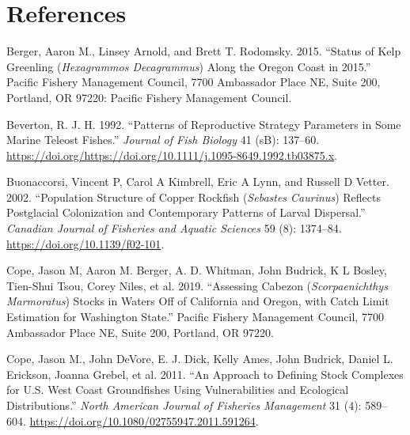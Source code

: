 \documentclass[11pt,
  english,
  a4paper,
]{article}
\begin{document}
\leavevmode\tagmcend\tagstructend\par

\clearpage


\hypertarget{references}{%
\section{References}\label{references}}

\leavevmode\tagmcend\tagstructend


\hypertarget{refs}{}
\leavevmode\hypertarget{ref-berger_kelpgreenling_2015}{}%
Berger, Aaron M., Linsey Arnold, and Brett T. Rodomsky. 2015. ``Status of Kelp Greenling (\emph{Hexagrammos Decagrammus}) Along the Oregon Coast in 2015.'' Pacific Fishery Management Council, 7700 Ambassador Place NE, Suite 200, Portland, OR 97220: Pacific Fishery Management Council.

\leavevmode\hypertarget{ref-Beverton1992}{}%
Beverton, R. J. H. 1992. ``Patterns of Reproductive Strategy Parameters in Some Marine Teleost Fishes.'' \emph{Journal of Fish Biology} 41 (sB): 137--60. \url{https://doi.org/https://doi.org/10.1111/j.1095-8649.1992.tb03875.x}.

\leavevmode\hypertarget{ref-buonaccorsi_population_2002}{}%
Buonaccorsi, Vincent P, Carol A Kimbrell, Eric A Lynn, and Russell D Vetter. 2002. ``Population Structure of Copper Rockfish (\emph{Sebastes Caurinus}) Reflects Postglacial Colonization and Contemporary Patterns of Larval Dispersal.'' \emph{Canadian Journal of Fisheries and Aquatic Sciences} 59 (8): 1374--84. \url{https://doi.org/10.1139/f02-101}.

\leavevmode\hypertarget{ref-cope_cabezon_2019}{}%
Cope, Jason M, Aaron M. Berger, A. D. Whitman, John Budrick, K L Bosley, Tien-Shui Tsou, Corey Niles, et al. 2019. ``Assessing Cabezon (\emph{Scorpaenichthys Marmoratus}) Stocks in Waters Off of California and Oregon, with Catch Limit Estimation for Washington State.'' Pacific Fishery Management Council, 7700 Ambassador Place NE, Suite 200, Portland, OR 97220.

\leavevmode\hypertarget{ref-cope_approach_2011}{}%
Cope, Jason M., John DeVore, E. J. Dick, Kelly Ames, John Budrick, Daniel L. Erickson, Joanna Grebel, et al. 2011. ``An Approach to Defining Stock Complexes for U.S. West Coast Groundfishes Using Vulnerabilities and Ecological Distributions.'' \emph{North American Journal of Fisheries Management} 31 (4): 589--604. \url{https://doi.org/10.1080/02755947.2011.591264}.
\end{document}
